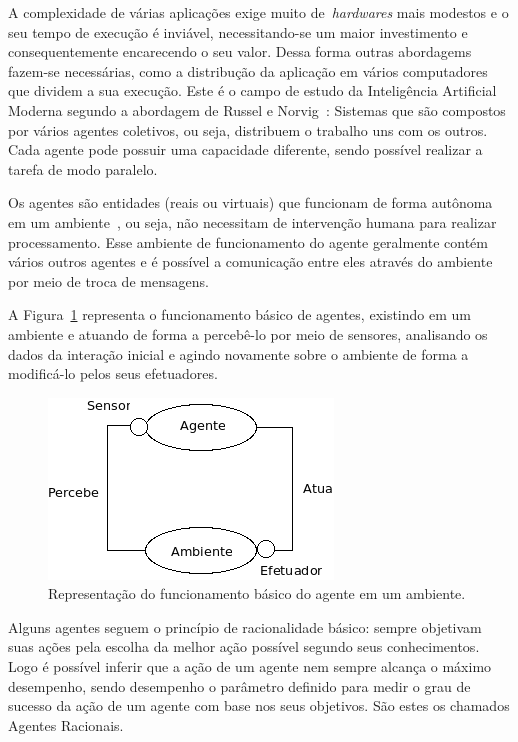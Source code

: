 A complexidade de várias aplicações exige muito de~\emph{hardwares} mais modestos e o seu tempo de execução é inviável, necessitando-se um maior investimento e consequentemente encarecendo o seu valor. Dessa forma outras abordagems fazem-se necessárias, como a distribução da aplicação em vários computadores que dividem a sua execução. Este é o campo de estudo da Inteligência Artificial Moderna segundo a abordagem de Russel e Norvig~\cite{novig95}: Sistemas que são compostos por vários agentes coletivos, ou seja, distribuem o trabalho uns com os outros. Cada agente pode possuir uma capacidade diferente, sendo possível realizar a tarefa de modo paralelo. 

Os agentes são entidades (reais ou virtuais) que funcionam de forma autônoma em um ambiente~\cite{novig95}, ou seja, não necessitam de intervenção humana para realizar processamento. Esse ambiente de funcionamento do agente geralmente contém vários outros agentes e é possível a comunicação entre eles através do ambiente por meio de troca de mensagens.

A Figura~\ref{fig:agente-basico} representa o funcionamento básico de agentes, existindo em um ambiente e atuando de forma a percebê-lo por meio de sensores, analisando os dados da interação inicial e agindo novamente sobre o ambiente de forma a modificá-lo pelos seus efetuadores.

\begin{figure}
	\centering
	\includegraphics[scale=0.75]{images/agente-basico.png}
	\caption{Representação do funcionamento básico do agente em um ambiente.}
	\label{fig:agente-basico}
\end{figure}

Alguns agentes seguem o princípio de racionalidade básico: sempre objetivam suas ações pela escolha da melhor ação possível segundo seus conhecimentos. Logo é possível inferir que a ação de um agente nem sempre alcança o máximo desempenho, sendo desempenho o parâmetro definido para medir o grau de sucesso da ação de um agente com base nos seus objetivos. São estes os chamados Agentes Racionais.

